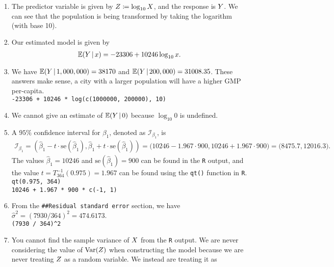\documentclass[10pt]{article}
\begin{document}
\begin{enumerate}
    \item The predictor variable is given by \(Z \coloneqq \log_{10}X\), and the response is \(Y\). We can see that the population is being transformed 
    by taking the logarithm (with base 10). 
    \item Our estimated model is given by 
    \begin{align}
        \mathbb{E}(Y \,|\, x)
        = -23306 + 10246 \log_{10} x.
    \end{align}
    \item We have \(\mathbb{E}(Y \,|\, 1,000,000) = 38170\) and \(\mathbb{E}(Y \,|\, 200,000) = 31008.35\).
    These answers make sense, a city with a larger population will have a higher GMP per-capita. \\[0.5em]
    \texttt{-23306 + 10246 * log(c(1000000, 200000), 10)}
    \item We cannot give an estimate of \(\mathbb{E}(Y \,|\, 0)\) because \(\log_{10} 0\) is undefined.
    \item A \(95\%\) confidence interval for \(\beta_1\), denoted as \(\mathcal{I}_{\beta_1}\), is
    \begin{align}
        \mathcal{I}_{\beta_1}
        = \left( \hat{\beta}_1 - t \cdot \mathrm{se}(\hat{\beta}_1), \hat{\beta}_1 + t \cdot \mathrm{se}(\hat{\beta}_1) \right)
        = \big( 10246 - 1.967 \cdot 900, 10246 + 1.967 \cdot 900 \big)
        = \big( 8475.7, 12016.3 \big).
    \end{align}
    The values \(\hat{\beta}_1 = 10246\) and \(\mathrm{se}(\hat{\beta}_1) = 900\) can be found in the \texttt{R} output, and the value 
    \(t = T_{364}^{-1}(0.975) = 1.967\) can be found using the \texttt{qt()} function in \texttt{R}. \\[0.5em]
    \texttt{qt(0.975, 364)}\\[0.5em]
    \texttt{10246 + 1.967 * 900 * c(-1, 1)}
    \item From the \texttt{\#{}\#{}Residual standard error} section, we have \(\hat{\sigma}^2 = (7930/364)^2 = 474.6173\). \\[0.5em]
    \texttt{(7930 / 364)\textasciicircum{}2}
    \item You cannot find the sample variance of \(X\) from the \texttt{R} output. We are never considering the value of 
    \(\mathrm{Var}(Z)\) when constructing the model because we are never treating \(Z\) as a random variable. We instead are treating it as 

\end{enumerate}
\end{document}
